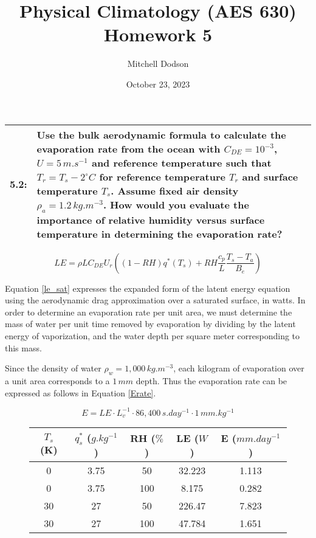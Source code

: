 \documentclass[12pt]{article}
\title{Physical Climatology (AES 630) Homework 5}
\author{Mitchell Dodson}
\date{October 23, 2023}
\newcommand*{\problem}[2]{
    \begin{table}[ht]
    \centering
        \begin{tabular}{ | p{.1\linewidth} p{.9\linewidth} | }
            \hline
            \vspace{.3em}\textbf{\large#1:} & \vspace{.3em}\small{#2}\hspace{.2em}\vspace{.5em} \\ \hline
        \end{tabular}
    \end{table}
}
\begin{document}
\vspace{-2em}

\maketitle

\vspace{-2em}

\problem{5.2}{
    Use the bulk aerodynamic formula to calculate the evaporation rate from the ocean with $C_{DE} = 10^{-3}$, $U = 5\,\si{m.s^{-1}}$ and reference temperature such that $T_r = T_s - 2^\circ\si{C}$ for reference temperature $T_r$ and surface temperature $T_s$. Assume fixed air density $\rho_a = 1.2\,\si{kg.m^{-3}}$. How would you evaluate the importance of relative humidity versus surface temperature in determining the evaporation rate?
}

\begin{equation}\label{le_sat}
    LE = \rho L C_{DE} U_r \left((1-RH) q^*(T_s) + RH \frac{c_p}{L} \frac{T_s - T_a}{B_e}\right)
\end{equation}


Equation \ref{le_sat} expresses the expanded form of the latent energy equation using the aerodynamic drag approximation over a saturated surface, in watts. In order to determine an evaporation rate per unit area, we must determine the mass of water per unit time removed by evaporation by dividing by the latent energy of vaporization, and the water depth per square meter corresponding to this mass.

Since the density of water $\rho_w = 1,000\,\si{kg.m^{-3}}$, each kilogram of evaporation over a unit area corresponds to a $1\,\si{mm}$ depth. Thus the evaporation rate can be expressed as follows in Equation \ref{Erate}.

\begin{equation}\label{Erate}
    E = LE \cdot L_v^{-1} \cdot 86,400\,\si{s.day^{-1}} \cdot 1\,\si{mm.kg^{-1}}
\end{equation}

\begin{figure}[h!]\label{q1}
    \centering
    \begin{tabular}{ c c c | c c}
        $T_s$ (K) & $q^*_s$ ($\si{g.kg^{-1}}$) & RH ($\%$) & LE ($\si{W}$)& E ($\si{mm.day^{-1}}$) \\
        \hline
        0 & 3.75 & 50 &  32.223 & 1.113 \\
        0 & 3.75 & 100 & 8.175 & 0.282 \\
        30 & 27 & 50 & 226.47 & 7.823 \\
        30 & 27 & 100 & 47.784 & 1.651 \\
    \end{tabular}
\end{figure}
\end{document}
